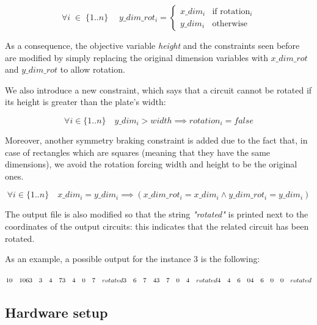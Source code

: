 \begin{equation*}
\forall i \; \in \; \{1..n\} \quad \; y\_dim\_rot_i  = \begin{cases} x\_dim_i & \mbox{if } \mbox{rotation$_i$} \\ y\_dim_i & \mbox{otherwise}\end{cases}
\end{equation*}

As a consequence, the objective variable \textit{height} and the constraints seen before are modified by simply replacing the original dimension variables with $x\_dim\_rot$ and $y\_dim\_rot$ to allow rotation. 

We also introduce a new constraint, which says that a circuit cannot be rotated if its height is greater than the plate's width:

\begin{equation*}
    \forall i \in \{1..n\} \quad y\_dim_i > width \implies rotation_i = false
\end{equation*}

Moreover, another symmetry braking constraint is added due to the fact that, in case of rectangles which are squares (meaning that they have the same dimensions), we avoid the rotation forcing width and height to be the original ones.

\begin{equation*}
     \forall i \in \{1..n\} \quad x\_dim_i = y\_dim_i \implies (x\_dim\_rot_i = x\_dim_i \land y\_dim\_rot_i = y\_dim_i)
\end{equation*}

The output file is also modified so that the string \textit{"rotated"} is printed next to the coordinates of the output circuits: this indicates that the related circuit has been rotated. 

As an example, a possible output for the instance 3 is the following:

$ 10 \quad 10 \\
6 \\
3 \quad 3 \quad 4 \quad 7 \\
3 \quad 4 \quad 0 \quad 7 \quad rotated \\
3 \quad 6 \quad 7 \quad 4 \\
3 \quad 7 \quad 0 \quad 4 \quad rotated \\
4 \quad 4 \quad 6 \quad 0 \\
4 \quad 6 \quad 0 \quad 0 \quad rotated $ 


\subsection{Hardware setup}

